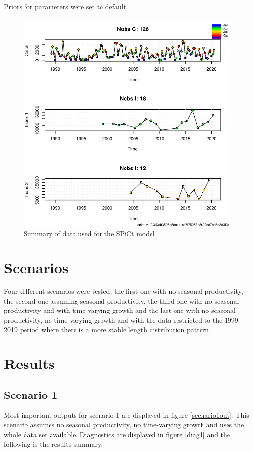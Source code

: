\documentclass[review]{elsarticle}
\begin{document}
Priors for parameters were set to default.


\begin{figure}[h!]
 \centering
 \includegraphics[]{./data.pdf}
 \caption{Summary of data used for the SPiCt model}
 \label{spdata}
\end{figure}


\section{Scenarios}

Four different scenarios were tested, the first one with no seasonal productivity, the second one assuming seasonal productivity, the third one with no seasonal productivity and with time-varying growth and the last one with no seasonal productivity, no time-varying growth and with the data restricted to the 1999-2019 period where there is a more stable length distribution pattern.

\section{Results}

\subsection{Scenario 1}
Most important outputs for scenario 1 are displayed in figure \ref{scenario1out}. This scenario assumes no seasonal productivity, no time-varying growth and uses the whole data set available. Diagnostics are displayed in figure \ref{diag1} and the following is the results summary:
\end{document}
